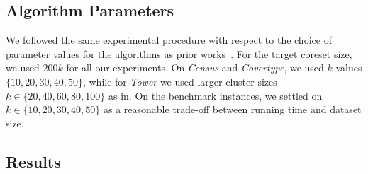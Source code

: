 \subsection{Algorithm Parameters}
We followed the same experimental procedure with respect to the choice of parameter values for the algorithms as prior works~\cite{FGSSS13, AckermannMRSLS12}. For the target coreset size, we used $200k$ for all our experiments. On \textit{Census} and \textit{Covertype}, we used $k$ values $\{10, 20, 30, 40, 50\}$, while for \textit{Tower} we used larger cluster sizes $k \in \{20, 40, 60, 80, 100\}$ as in. On the benchmark instances, we settled on $k \in \{10, 20, 30, 40, 50\}$ as a reasonable trade-off between running time and dataset size.



\subsection{Results}

